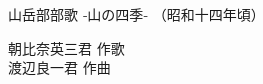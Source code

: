\documentclass[10pt,b5j]{tarticle} %
\begin{document}
\begin{minipage}[c]{0.7\hsize} %
    \begin{center}
        {\LARGE
            山岳部部歌 %
        }
        {\large 
            ‐山の四季‐
        }
        {\small 
            （昭和十四年頃） %
        }
    \end{center}
\end{minipage}
\begin{minipage}[c]{0.3\hsize} %
    \begin{flushright} %
        朝比奈英三君 作歌\\渡辺良一君 作曲 %
    \end{flushright}
\end{minipage}
\end{document}
